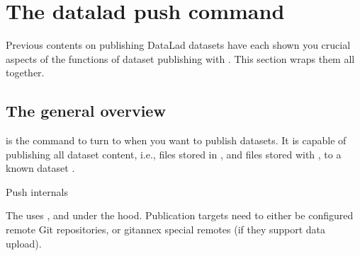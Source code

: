 \sphinxstepscope

\ignorespaces 

\section{The datalad push command}
\label{\detokenize{basics/101-141-push:the-datalad-push-command}}\label{\detokenize{basics/101-141-push:push}}\label{\detokenize{basics/101-141-push:index-0}}\label{\detokenize{basics/101-141-push::doc}}
\sphinxAtStartPar
Previous contents on publishing DataLad datasets have each
shown you crucial aspects of the functions of dataset publishing with
. This section wraps them all together.


\subsection{The general overview}
\label{\detokenize{basics/101-141-push:the-general-overview}}
\sphinxAtStartPar
{} is the command to turn to when you want to publish datasets.
It is capable of publishing all dataset content, i.e., files stored in {\hyperref[\detokenize{glossary:term-Git}]{}},
and files stored with {\hyperref[\detokenize{glossary:term-git-annex}]{}}, to a known dataset {\hyperref[\detokenize{glossary:term-sibling}]{}}.

\ignorespaces \begin{gitusernote}[label={index-1}, before title={\thetcbcounter\ }, check odd page=true]{Push internals}
\label{\detokenize{basics/101-141-push:index-1}}

\sphinxAtStartPar
The  uses , and  under
the hood. Publication targets need to either be configured remote Git repositories,
or git\sphinxhyphen{}annex special remotes (if they support data upload).


\end{gitusernote}

